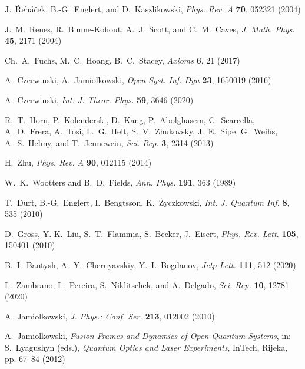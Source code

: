 \documentclass[aps,pra,reprint,groupedaddress,showkeys]{revtex4-1}
\begin{document}
\begin{thebibliography}{1}
 J.~\v{R}eh\'{a}\v{c}ek, B.-G.~Englert, and D.~Kaszlikowski, \textit{Phys. Rev. A} \textbf{70}, 052321 (2004) 

J.~M.~Renes, R.~Blume-Kohout, A.~J.~Scott, and C.~M.~Caves, \textit{J. Math. Phys.} \textbf{45}, 2171 (2004) 

Ch.~A.~Fuchs, M.~C.~Hoang, B.~C.~Stacey, \textit{Axioms} \textbf{6}, 21 (2017) 

A.~Czerwinski, A.~Jamiolkowski, \textit{Open Syst. Inf. Dyn} \textbf{23}, 1650019 (2016)  

A.~Czerwinski, \textit{Int. J. Theor. Phys.} \textbf{59}, 3646 (2020)  \

R.~T.~Horn, P.~Kolenderski, D.~Kang, P.~Abolghasem, C.~Scarcella, A.~D.~Frera, A.~Tosi, L.~G.~Helt, S.~V.~Zhukovsky, J.~E.~Sipe, G.~Weihs, A.~S.~Helmy, and T.~Jennewein, \textit{Sci. Rep.} \textbf{3}, 2314 (2013)  

H.~Zhu, \textit{Phys. Rev. A} \textbf{90}, 012115 (2014) 

W.~K.~Wootters and B.~D.~Fields, \textit{Ann. Phys.} \textbf{191}, 363 (1989)  

T.~Durt, B.-G.~Englert, I.~Bengtsson, K.~\.Zyczkowski, \textit{Int. J. Quantum Inf.} \textbf{8}, 535 (2010) 

D.~Gross, Y.-K.~Liu, S.~T.~Flammia, S.~Becker, J.~Eisert, \textit{Phys. Rev. Lett.} \textbf{105}, 150401 (2010) 

B.~I.~Bantysh, A.~Y.~Chernyavskiy, Y.~I.~Bogdanov, \textit{Jetp Lett.} \textbf{111}, 512 (2020) 

L.~Zambrano, L.~Pereira, S.~Niklitschek, and A.~Delgado, \textit{Sci. Rep.} \textbf{10}, 12781 (2020) 

A.~Jamiolkowski, \textit{J. Phys.: Conf. Ser.} \textbf{213}, 012002 (2010) 

A.~Jamiolkowski, \textit{Fusion Frames and Dynamics of Open Quantum Systems}, in: S.~Lyagushyn (eds.), \textit{Quantum Optics and Laser Experiments}, InTech, Rijeka, pp. 67–84 (2012) 


\end{thebibliography}
\end{document}
